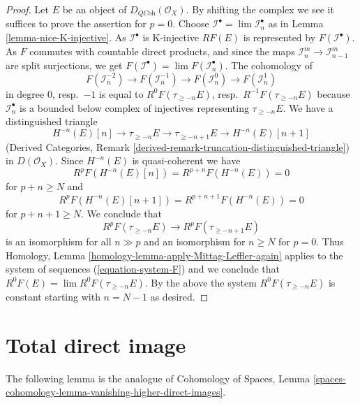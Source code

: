 \begin{proof}
Let $E$ be an object of $D_{\textit{QCoh}}(\mathcal{O}_X)$.
By shifting the complex we see it suffices to prove the assertion
for $p = 0$. Choose $\mathcal{I}^\bullet = \lim \mathcal{I}_n^\bullet$
as in Lemma \ref{lemma-nice-K-injective}.
As $\mathcal{I}^\bullet$ is K-injective $RF(E)$ is represented by
$F(\mathcal{I}^\bullet)$. As $F$ commutes with countable direct
products, and since the maps $\mathcal{I}_n^m \to \mathcal{I}_{n - 1}^m$
are split surjections, we get
$F(\mathcal{I}^\bullet) = \lim F(\mathcal{I}_n^\bullet)$.
The cohomology of
\begin{equation}
\label{equation-system-F}
F(\mathcal{I}_n^{-2}) \to
F(\mathcal{I}_n^{-1}) \to
F(\mathcal{I}_n^0) \to
F(\mathcal{I}_n^1)
\end{equation}
in degree $0$, resp.\ $-1$ is equal to $R^0F(\tau_{\geq -n}E)$,
resp.\ $R^{-1}F(\tau_{\geq -n}E)$ because $\mathcal{I}_n^\bullet$
is a bounded below complex of injectives representing $\tau_{\geq -n}E$.
We have a distinguished triangle
$$
H^{-n}(E)[n] \to \tau_{\geq -n}E \to \tau_{\geq - n + 1}E \to H^{-n}(E)[n + 1]
$$
(Derived Categories, Remark
\ref{derived-remark-truncation-distinguished-triangle})
in $D(\mathcal{O}_X)$. Since $H^{-n}(E)$ is quasi-coherent we have
$$
R^pF(H^{-n}(E)[n]) = R^{p + n}F(H^{-n}(E)) = 0
$$
for $p + n \geq N$ and
$$
R^pF(H^{-n}(E)[n + 1]) = R^{p + n + 1}F(H^{-n}(E)) = 0
$$
for $p + n + 1 \geq N$. We conclude that
$$
R^pF(\tau_{\geq -n}E) \to R^pF(\tau_{\geq - n + 1}E)
$$
is an isomorphism for all $n \gg p$ and an isomorphism for
$n \geq N$ for $p = 0$. Thus
Homology, Lemma \ref{homology-lemma-apply-Mittag-Leffler-again}
applies to the system of sequences (\ref{equation-system-F})
and we conclude that $R^0F(E) = \lim R^0F(\tau_{\geq - n}E)$.
By the above the system $R^0F(\tau_{\geq - n}E)$ is constant starting
with $n = N - 1$ as desired.
\end{proof}









\section{Total direct image}
\label{section-total-direct-image}

\noindent
The following lemma is the analogue of
Cohomology of Spaces, Lemma
\ref{spaces-cohomology-lemma-vanishing-higher-direct-images}.

